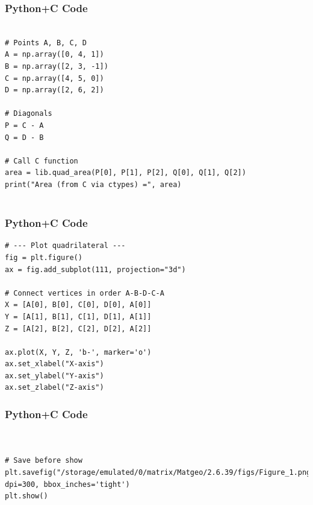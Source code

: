 \documentclass{beamer}
\begin{document}
\begin{frame}[fragile]
    \frametitle{Python+C Code}
    \begin{lstlisting}

# Points A, B, C, D
A = np.array([0, 4, 1])
B = np.array([2, 3, -1])
C = np.array([4, 5, 0])
D = np.array([2, 6, 2])

# Diagonals
P = C - A
Q = D - B

# Call C function
area = lib.quad_area(P[0], P[1], P[2], Q[0], Q[1], Q[2])
print("Area (from C via ctypes) =", area)


    \end{lstlisting}
\end{frame}

\begin{frame}[fragile]
    \frametitle{Python+C Code}
    \begin{lstlisting}
# --- Plot quadrilateral ---
fig = plt.figure()
ax = fig.add_subplot(111, projection="3d")

# Connect vertices in order A-B-D-C-A
X = [A[0], B[0], C[0], D[0], A[0]]
Y = [A[1], B[1], C[1], D[1], A[1]]
Z = [A[2], B[2], C[2], D[2], A[2]]

ax.plot(X, Y, Z, 'b-', marker='o')
ax.set_xlabel("X-axis")
ax.set_ylabel("Y-axis")
ax.set_zlabel("Z-axis")
    \end{lstlisting}
\end{frame}


\begin{frame}[fragile]
    \frametitle{Python+C Code}
    \begin{lstlisting}


# Save before show
plt.savefig("/storage/emulated/0/matrix/Matgeo/2.6.39/figs/Figure_1.png", dpi=300, bbox_inches='tight')
plt.show()
    \end{lstlisting}
\end{frame}
\end{document}
